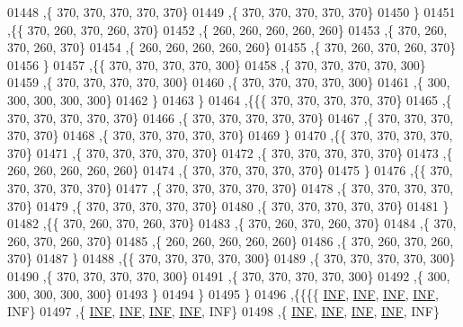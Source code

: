 \begin{DoxyCode}
01448    ,\{   370,   370,   370,   370,   370\}
01449    ,\{   370,   370,   370,   370,   370\}
01450    \}
01451   ,\{\{   370,   260,   370,   260,   370\}
01452    ,\{   260,   260,   260,   260,   260\}
01453    ,\{   370,   260,   370,   260,   370\}
01454    ,\{   260,   260,   260,   260,   260\}
01455    ,\{   370,   260,   370,   260,   370\}
01456    \}
01457   ,\{\{   370,   370,   370,   370,   300\}
01458    ,\{   370,   370,   370,   370,   300\}
01459    ,\{   370,   370,   370,   370,   300\}
01460    ,\{   370,   370,   370,   370,   300\}
01461    ,\{   300,   300,   300,   300,   300\}
01462    \}
01463   \}
01464  ,\{\{\{   370,   370,   370,   370,   370\}
01465    ,\{   370,   370,   370,   370,   370\}
01466    ,\{   370,   370,   370,   370,   370\}
01467    ,\{   370,   370,   370,   370,   370\}
01468    ,\{   370,   370,   370,   370,   370\}
01469    \}
01470   ,\{\{   370,   370,   370,   370,   370\}
01471    ,\{   370,   370,   370,   370,   370\}
01472    ,\{   370,   370,   370,   370,   370\}
01473    ,\{   260,   260,   260,   260,   260\}
01474    ,\{   370,   370,   370,   370,   370\}
01475    \}
01476   ,\{\{   370,   370,   370,   370,   370\}
01477    ,\{   370,   370,   370,   370,   370\}
01478    ,\{   370,   370,   370,   370,   370\}
01479    ,\{   370,   370,   370,   370,   370\}
01480    ,\{   370,   370,   370,   370,   370\}
01481    \}
01482   ,\{\{   370,   260,   370,   260,   370\}
01483    ,\{   370,   260,   370,   260,   370\}
01484    ,\{   370,   260,   370,   260,   370\}
01485    ,\{   260,   260,   260,   260,   260\}
01486    ,\{   370,   260,   370,   260,   370\}
01487    \}
01488   ,\{\{   370,   370,   370,   370,   300\}
01489    ,\{   370,   370,   370,   370,   300\}
01490    ,\{   370,   370,   370,   370,   300\}
01491    ,\{   370,   370,   370,   370,   300\}
01492    ,\{   300,   300,   300,   300,   300\}
01493    \}
01494   \}
01495  \}
01496 ,\{\{\{\{   \hyperlink{energy__const_8h_a12c2040f25d8e3a7b9e1c2024c618cb6}{INF},   \hyperlink{energy__const_8h_a12c2040f25d8e3a7b9e1c2024c618cb6}{INF},   \hyperlink{energy__const_8h_a12c2040f25d8e3a7b9e1c2024c618cb6}{INF},   \hyperlink{energy__const_8h_a12c2040f25d8e3a7b9e1c2024c618cb6}{INF},   INF\}
01497    ,\{   \hyperlink{energy__const_8h_a12c2040f25d8e3a7b9e1c2024c618cb6}{INF},   \hyperlink{energy__const_8h_a12c2040f25d8e3a7b9e1c2024c618cb6}{INF},   \hyperlink{energy__const_8h_a12c2040f25d8e3a7b9e1c2024c618cb6}{INF},   \hyperlink{energy__const_8h_a12c2040f25d8e3a7b9e1c2024c618cb6}{INF},   INF\}
01498    ,\{   \hyperlink{energy__const_8h_a12c2040f25d8e3a7b9e1c2024c618cb6}{INF},   \hyperlink{energy__const_8h_a12c2040f25d8e3a7b9e1c2024c618cb6}{INF},   \hyperlink{energy__const_8h_a12c2040f25d8e3a7b9e1c2024c618cb6}{INF},   \hyperlink{energy__const_8h_a12c2040f25d8e3a7b9e1c2024c618cb6}{INF},   INF\}

\end{DoxyCode}
